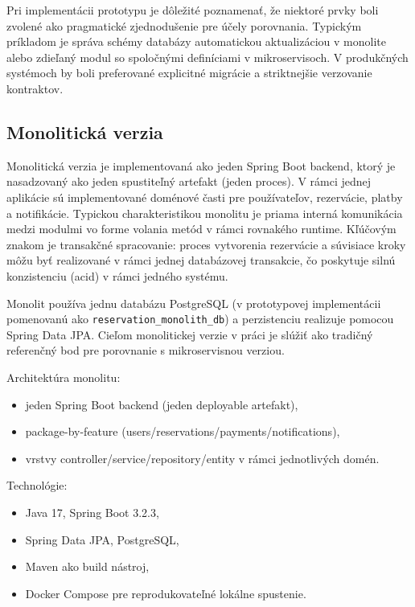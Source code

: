Pri implementácii prototypu je dôležité poznamenať, že niektoré prvky boli zvolené ako pragmatické zjednodušenie pre účely porovnania. Typickým príkladom je správa schémy databázy automatickou aktualizáciou v monolite alebo zdieľaný modul so spoločnými definíciami v mikroservisoch. V produkčných systémoch by boli preferované explicitné migrácie a striktnejšie verzovanie kontraktov.

\subsection{Monolitická verzia}

Monolitická verzia je implementovaná ako jeden Spring Boot backend, ktorý je nasadzovaný ako jeden spustiteľný artefakt (jeden proces). V rámci jednej aplikácie sú implementované doménové časti pre používateľov, rezervácie, platby a notifikácie. Typickou charakteristikou monolitu je priama interná komunikácia medzi modulmi vo forme volania metód v rámci rovnakého runtime. Kľúčovým znakom je transakčné spracovanie: proces vytvorenia rezervácie a súvisiace kroky môžu byť realizované v rámci jednej databázovej transakcie, čo poskytuje silnú konzistenciu (\acrshort{acid}) v rámci jedného systému.

Monolit používa jednu databázu PostgreSQL (v prototypovej implementácii pomenovanú ako \texttt{reservation\_monolith\_db}) a perzistenciu realizuje pomocou Spring Data JPA. Cieľom monolitickej verzie v práci je slúžiť ako tradičný referenčný bod pre porovnanie s mikroservisnou verziou.

Architektúra monolitu:
\begin{itemize}
    \item jeden Spring Boot backend (jeden deployable artefakt),
    \item package-by-feature (users/reservations/payments/notifications),
    \item vrstvy controller/service/repository/entity v rámci jednotlivých domén.
\end{itemize}

Technológie:
\begin{itemize}
    \item Java 17, Spring Boot 3.2.3,
    \item Spring Data JPA, PostgreSQL,
    \item Maven ako build nástroj,
    \item Docker Compose pre reprodukovateľné lokálne spustenie.
\end{itemize}

